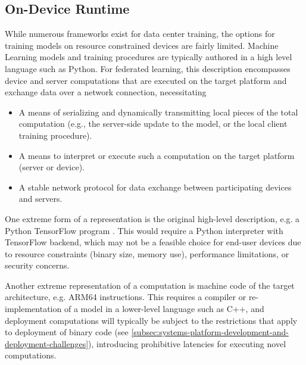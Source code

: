 \documentclass[11pt]{article}
\begin{document}
\subsection{On-Device Runtime}
\label{subsec:systems-on-device-runtime}
While numerous frameworks exist for data center training, the options for training models on resource constrained devices are fairly limited. Machine Learning models and training procedures are typically authored in a high level language such as Python. For federated learning, this description encompasses device and server computations that are executed on the target platform and exchange data over a network connection, necessitating
\begin{itemize}
    \item A means of serializing and dynamically transmitting local pieces of the total computation (e.g., the server-side update to the model, or the local client training procedure).
    \item A means to interpret or execute such a computation on the target platform (server or device).
    \item A stable network protocol for data exchange between participating devices and servers.
\end{itemize}

One extreme form of a representation is the original high-level description, e.g. a Python TensorFlow program \citep{tensorflow2015-whitepaper}. This would require a Python interpreter with TensorFlow backend, which may not be a feasible choice for end-user devices due to resource constraints (binary size, memory use), performance limitations, or security concerns.

Another extreme representation of a computation is machine code of the target architecture, e.g. ARM64 instructions. This requires a compiler or re-implementation of a model in a lower-level language such as C++, and deployment computations will typically be subject to the restrictions that apply to deployment of binary code (see \cref{subsec:systems-platform-development-and-deployment-challenges}), introducing prohibitive latencies for executing novel computations.
\end{document}
